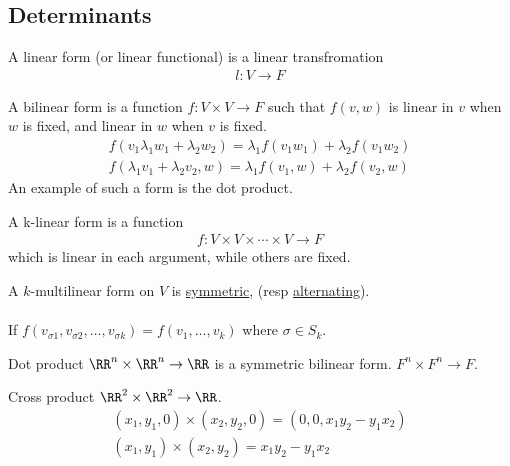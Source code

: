 \documentclass[class=scrartcl, crop=false]{standalone}
\begin{document}
\subsection{Determinants}

\begin{definition}
  A linear form (or linear functional) is a linear transfromation 
  \begin{gather*}
    l: V \to F
  \end{gather*} 
\end{definition} 

\begin{definition}
  A bilinear form is a function $f: V \times V \to F$ such that $f(v, w)$ is linear in $v$ when $w$ is fixed, and linear in $w$ when $v$ is fixed.
  \begin{gather*}
    f(v_1\lambda_1w_1 + \lambda_2w_2) = \lambda_1f(v_1w_1) + \lambda_2f(v_1w_2) \\
    f(\lambda_1v_1 + \lambda_2v_2, w) = \lambda_1f(v_1, w) + \lambda_2f(v_2, w)
  \end{gather*} 
  An example of such a form is the dot product.
\end{definition} 

\begin{definition}
  A k-linear form is a function
  \begin{gather*}
    f: V \times V \times \cdots \times V \to F
  \end{gather*} 
  which is linear in each argument, while others are fixed.
\end{definition} 

\begin{definition}
  A $k$-multilinear form on  $V$ is \ul{symmetric}, (resp \ul{alternating}).
  \\\\
  If $f(v_{\sigma 1}, v_{\sigma 2}, \dots, v_{\sigma k}) = f(v_1, \dots, v_k)$ where $\sigma \in S_k$. 
\end{definition} 

\begin{example}
  Dot product $\RR^n \times \RR^n \to \RR$ is a symmetric bilinear form. $F^n \times F^n \to F$.
\end{example} 
\begin{example}
  Cross product $\RR^2 \times \RR^2 \to \RR$. 
  \begin{gather*}
    (x_1, y_1, 0) \times (x_2, y_2, 0) = (0, 0, x_1y_2 - y_1x_2) \\
    (x_1, y_1) \times(x_2, y_2) = x_1y_2 - y_1x_2
  \end{gather*} 
\end{example} 
\end{document}
